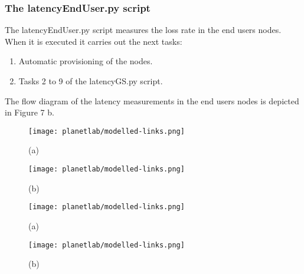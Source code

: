 \subsubsection{The latencyEndUser.py script}

The latencyEndUser.py  script measures the loss rate in the end users
nodes. When it is executed it carries out the next tasks:
\begin{enumerate}
\item Automatic provisioning of the nodes.
\item Tasks 2 to 9 of the latencyGS.py script.
\end{enumerate}

The flow diagram of the latency measurements in the end users nodes is depicted
in Figure 7 b.

\begin{multicols}{2}
\begin{figure}[!h]
\begin{center}
\texttt{[image: planetlab/modelled-links.png]}
\caption{(a)}
\label{fig:ple-modelled-links}
\end{center}
\end{figure}
\columnbreak
\begin{figure}[!h]
\begin{center}
\texttt{[image: planetlab/modelled-links.png]}
\caption{(b)}
\label{fig:ple-modelled-links}
\end{center}
\end{figure}
\end{multicols}

\begin{multicols}{2}
\begin{figure}[!h]
\begin{center}
\texttt{[image: planetlab/modelled-links.png]}
\caption{(a)}
\label{fig:ple-modelled-links}
\end{center}
\end{figure}
\columnbreak
\begin{figure}[!h]
\begin{center}
\texttt{[image: planetlab/modelled-links.png]}
\caption{(b)}
\label{fig:ple-modelled-links}
\end{center}
\end{figure}
\end{multicols}



